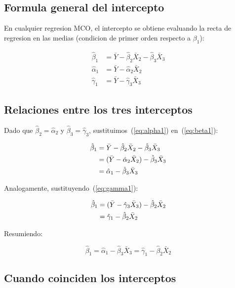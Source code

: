 \documentclass[12pt, letterpaper]{article}
\theoremstyle{remark}
\begin{document}
\subsection{Formula general del intercepto}

En cualquier regresion MCO, el intercepto se obtiene evaluando la recta
de regresion en las medias (condicion de primer orden respecto a $\beta_1$):

\begin{align}
  \hat\beta_1 &= \bar Y - \hat\beta_2 \bar X_2 - \hat\beta_3 \bar X_3
  \label{eq:beta1}\\
  \hat\alpha_1 &= \bar Y - \hat\alpha_2 \bar X_2
  \label{eq:alpha1}\\
  \hat\gamma_1 &= \bar Y - \hat\gamma_3 \bar X_3
  \label{eq:gamma1}
\end{align}

\subsection{Relaciones entre los tres interceptos}

Dado que $\hat\beta_2 = \hat\alpha_2$ y $\hat\beta_3 = \hat\gamma_3$,
sustituimos~(\ref{eq:alpha1}) en~(\ref{eq:beta1}):

\begin{align}
  \hat\beta_1
  &= \bar Y - \hat\beta_2 \bar X_2 - \hat\beta_3 \bar X_3
  \notag\\
  &= (\bar Y - \hat\alpha_2 \bar X_2) - \hat\beta_3 \bar X_3
  \notag\\
  &= \hat\alpha_1 - \hat\beta_3 \bar X_3
  \label{eq:beta1_vs_alpha1}
\end{align}

Analogamente, sustituyendo~(\ref{eq:gamma1}):

\begin{align}
  \hat\beta_1
  &= (\bar Y - \hat\gamma_3 \bar X_3) - \hat\beta_2 \bar X_2
  \notag\\
  &= \hat\gamma_1 - \hat\beta_2 \bar X_2
  \label{eq:beta1_vs_gamma1}
\end{align}

Resumiendo:

\begin{equation}
  \boxed{
    \hat\beta_1
      = \hat\alpha_1 - \hat\beta_3 \bar X_3
      = \hat\gamma_1 - \hat\beta_2 \bar X_2
  }
  \label{eq:relacion_interceptos}
\end{equation}

\subsection{Cuando coinciden los interceptos}
\end{document}
